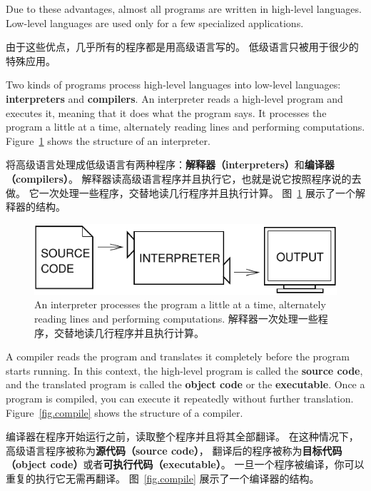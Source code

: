 \documentclass[10pt]{book}
\begin{document}
\begin{CJK}{UTF8}{gbsn}
Due to these advantages, almost all programs are written in high-level
languages.  Low-level languages are used only for a few specialized
applications.

由于这些优点，几乎所有的程序都是用高级语言写的。
低级语言只被用于很少的特殊应用。

Two kinds of programs process high-level languages into low-level
languages: {\bf interpreters} and {\bf compilers}.  An interpreter
reads a high-level program and executes it, meaning that it does what
the program says.  It processes the program a little at a time,
alternately reading lines and performing computations.
Figure~\ref{fig.interpret} shows the structure of an interpreter.

将高级语言处理成低级语言有两种程序：{\bf 解释器（interpreters）}和{\bf 编译器（compilers）}。
解释器读高级语言程序并且执行它，也就是说它按照程序说的去做。
它一次处理一些程序，交替地读几行程序并且执行计算。
图~\ref{fig.interpret} 展示了一个解释器的结构。

\begin{figure}
\centerline
{\includegraphics[scale=0.9]{figs/interpret.pdf}}
\caption{An interpreter processes the program a little at a time,
alternately reading lines and performing computations. 
解释器一次处理一些程序，交替地读几行程序并且执行计算。}
\label{fig.interpret}
\end{figure}

A compiler reads the program and translates it completely before the
program starts running.  In this context, the high-level program is
called the {\bf source code}, and the translated program is called the
{\bf object code} or the {\bf executable}.  Once a program is
compiled, you can execute it repeatedly without further translation.
Figure~\ref{fig.compile} shows the structure of a compiler.

编译器在程序开始运行之前，读取整个程序并且将其全部翻译。
在这种情况下，高级语言程序被称为{\bf 源代码（source code）}，
翻译后的程序被称为{\bf 目标代码（object code）}或者{\bf 可执行代码（executable）}。
一旦一个程序被编译，你可以重复的执行它无需再翻译。
图~\ref{fig.compile} 展示了一个编译器的结构。


\end{CJK}
\end{document}
